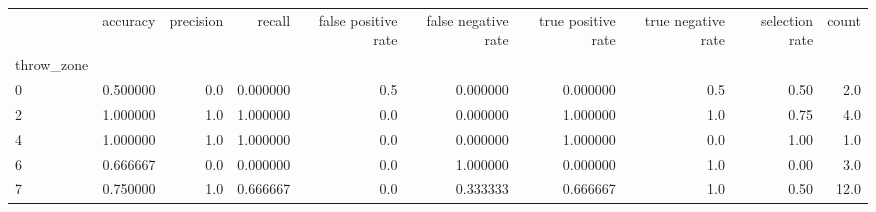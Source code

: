 \begin{tabular}{lrrrrrrrrr}
\toprule
{} &  accuracy &  precision &    recall &  false positive rate &  false negative rate &  true positive rate &  true negative rate &  selection rate &  count \\
throw\_zone &           &            &           &                      &                      &                     &                     &                 &        \\
\midrule
0          &  0.500000 &        0.0 &  0.000000 &                  0.5 &             0.000000 &            0.000000 &                 0.5 &            0.50 &    2.0 \\
2          &  1.000000 &        1.0 &  1.000000 &                  0.0 &             0.000000 &            1.000000 &                 1.0 &            0.75 &    4.0 \\
4          &  1.000000 &        1.0 &  1.000000 &                  0.0 &             0.000000 &            1.000000 &                 0.0 &            1.00 &    1.0 \\
6          &  0.666667 &        0.0 &  0.000000 &                  0.0 &             1.000000 &            0.000000 &                 1.0 &            0.00 &    3.0 \\
7          &  0.750000 &        1.0 &  0.666667 &                  0.0 &             0.333333 &            0.666667 &                 1.0 &            0.50 &   12.0 \\
\bottomrule
\end{tabular}
